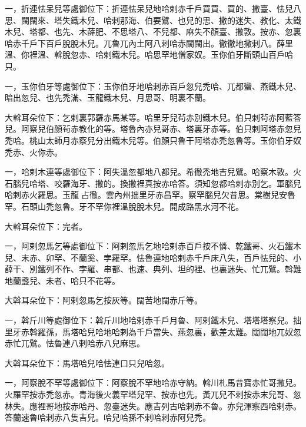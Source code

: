 \begin{pinyinscope}
 一，折連怯呆兒等處御位下：折連怯呆兒地哈剌赤千戶買買、買的、撒臺、怯兒八思、闊闊來、塔失鐵木兒、哈剌那海、伯要鷿、也兒的思、撒的迷失、教化、太鐵木兒、塔都、也先、木薛肥、不思塔八、不兒都、麻失不顏臺、撒敦。按赤、忽裏哈赤千戶下百戶脫脫木兒。兀魯兀內土阿八剌哈赤闊闊出。徹徹地撒剌八。薛里溫、你裡溫、斡脫忽赤、哈剌鐵木兒。哈思罕地僧家奴。玉你伯牙斷頭山百戶哈只。



 一，玉你伯牙等處御位下：玉你伯牙地哈剌赤百戶忽兒禿哈、兀都蠻、燕鐵木兒、暗出忽兒、也先禿滿、玉龍鐵木兒、月思哥、明裏不蘭。



 大斡耳朵位下：乞剌裏郭羅赤馬某等。哈里牙兒茍赤別鐵木兒。伯只剌茍赤阿藍答兒。阿察兒伯顏茍赤教化的等。塔魯內亦兒哥赤、塔裏牙赤等。伯只剌阿塔赤忽兒禿哈。桃山太師月赤察兒分出鐵木兒等。伯顏只魯干阿塔赤禿忽魯等。玉你伯牙奴禿赤、火你赤。



 一，哈剌木連等處御位下：阿失溫忽都地八都兒。希徹禿地吉兒鷿。哈察木敦。火石腦兒哈塔、咬羅海牙、撒的。換撒裡真按赤哈答。須知忽都哈剌赤別乞。軍腦兒哈剌赤火羅思。玉龍占徹。雲內州拙里牙赤昌罕。察罕腦兒欠昔思。棠樹兒安魯罕。石頭山禿忽魯。牙不罕你裡溫脫脫木兒。開成路黑水河不花。



 大斡耳朵位下：完者。



 一，阿剌忽馬乞等處御位下：阿剌忽馬乞地哈剌赤百戶按不憐、乾鐵哥、火石鐵木兒、末赤、卯罕、不蘭奚、孛羅罕。怯魯連地哈剌赤千戶床八失，百戶怯兒的、小薛干、別鐵列不作、孛羅、串都、也速、典列、坦的裡、也裏迷失、忙兀鷿。斡難地蘭盞兒、未者、哈只不花等。



 大斡耳朵位下：阿剌忽馬乞按灰等。闊苦地闊赤斤等。



 一，斡斤川等處御位下：斡斤川地哈剌赤千戶月魯、阿剌鐵木兒、塔塔塔察兒。拙里牙赤斡羅孫，馬塔哈兒哈地哈剌為千戶當失、燕忽裏，歡差太難。闊闊地兀奴忽赤忙兀鷿。怯魯連八剌哈赤八兒麻思。



 大斡耳朵位下：馬塔哈兒哈怯連口只兒哈忽。



 一，阿察脫不罕等處御位下：阿察脫不罕地哈赤守納。斡川札馬昔寶赤忙哥撒兒。火羅罕按赤禿忽赤。青海後火義罕塔兒罕、按赤也先。黃兀兒不剌按赤末兒哥、忽林失。應裡哥地按赤哈丹、忽臺迷失。應吉列古哈剌赤不魯。亦兒渾察西哈剌赤。答蘭速魯哈剌赤八隻吉兒。哈兒哈孫不剌哈剌赤阿兒禿。




\end{pinyinscope}
